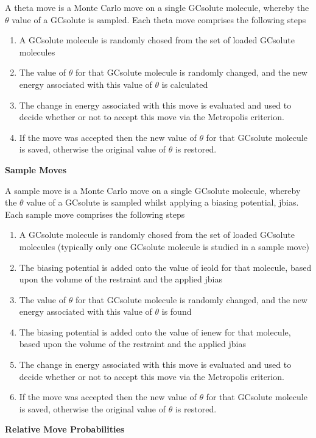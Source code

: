 \documentclass[letterpaper,10pt,english]{manual}
\begin{document}
A theta move is a Monte Carlo move on a single GCsolute molecule, whereby the $\theta$ value of a GCsolute is sampled. Each theta move comprises the following steps
\begin{enumerate}
\item {} 
A GCsolute molecule is randomly chosed from the set of loaded GCsolute molecules

\item {} 
The value of $\theta$ for that GCsolute molecule is randomly changed, and the new energy associated with this value of $\theta$ is calculated

\item {} 
The change in energy associated with this move is evaluated and used to decide whether or not to accept this move via the Metropolis criterion.

\item {} 
If the move was accepted then the new value of $\theta$ for that GCsolute molecule is saved, otherwise the original value of $\theta$ is restored.

\end{enumerate}
\textbf{Sample Moves}

A sample move is a Monte Carlo move on a single GCsolute molecule, whereby the $\theta$ value of a GCsolute is sampled whilst applying a biasing potential, jbias. Each sample move comprises the following steps
\begin{enumerate}
\item {} 
A GCsolute molecule is randomly chosed from the set of loaded GCsolute molecules (typically only one GCsolute molecule is studied in a sample move)

\item {} 
The biasing potential is added onto the value of ieold for that molecule, based upon the volume of the restraint and the applied jbias

\item {} 
The value of $\theta$ for that GCsolute molecule is randomly changed, and the new energy associated with this value of $\theta$ is found

\item {} 
The biasing potential is added onto the value of ienew for that molecule, based upon the volume of the restraint and the applied jbias

\item {} 
The change in energy associated with this move is evaluated and used to decide whether or not to accept this move via the Metropolis criterion.

\item {} 
If the move was accepted then the new value of $\theta$ for that GCsolute molecule is saved, otherwise the original value of $\theta$ is restored.

\end{enumerate}
\textbf{Relative Move Probabilities}
\end{document}
